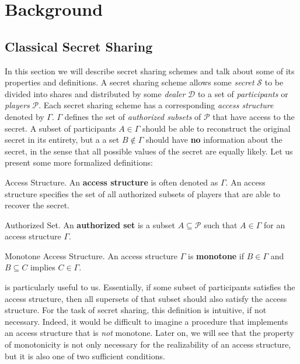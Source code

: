 \chapter{Background}
\label{ch:background}

\section{Classical Secret Sharing}
\label{sec:css}

In this section we will describe secret sharing schemes and talk about some of its properties and definitions. A secret sharing scheme allows some \textit{secret} $\mathcal{S}$ to be divided into shares and distributed by some \textit{dealer} $\mathcal{D}$ to a set of \textit{participants} or \textit{players} $\mathcal{P}$. Each secret sharing scheme has a corresponding \textit{access structure} denoted by $\Gamma$. $\Gamma$ defines the set of \textit{authorized subsets} of $\mathcal{P}$ that have access to the secret. A subset of participants $A \in \Gamma$ should be able to reconstruct the original secret in its entirety, but a a set $B \notin \Gamma$ should have \textbf{no} information about the secret, in the sense that all possible values of the secret are equally likely. Let us present some more formalized definitions:

\theoremstyle{definition}
\begin{definition}{Access Structure.}
    \label{defn:access-structure}
    An \textbf{access structure} is often denoted as $\Gamma$. An access structure specifies the set of all authorized subsets of players that are able to recover the secret.
\end{definition}

\theoremstyle{definition}
\begin{definition}{Authorized Set.}
    \label{defn:authorized-set}
    An \textbf{authorized set} is a subset $A \subseteq \mathcal{P}$ such that $A \in \Gamma$ for an access structure $\Gamma$.
\end{definition}

\theoremstyle{definition}
\begin{definition}{Monotone Access Structure.}
    \label{defn:monotone}
    An access structure $\Gamma$ is \textbf{monotone} if $B \in \Gamma$ and $B \subseteq C$ implies $C \in \Gamma$.
\end{definition}

 is particularly useful to us. Essentially, if some subset of participants satisfies the access structure, then all supersets of that subset should also satisfy the access structure. For the task of secret sharing, this definition is intuitive, if not necessary. Indeed, it would be difficult to imagine a procedure that implements an access structure that is \textit{not} monotone. Later on, we will see that the property of monotonicity is not only necessary for the realizability of an access structure, but it is also one of two sufficient conditions.

